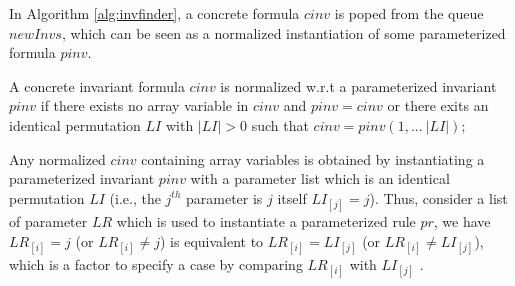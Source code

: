 \documentclass[final]{IEEEtran}
\newcommand\lyj[1]{\textcolor{magenta}{lyj: #1}}
\begin{document}
{In Algorithm \ref{alg:invfinder}, a concrete formula $cinv$ is poped from the queue $newInvs$, which can be seen as a normalized instantiation of some parameterized formula $pinv$. %


\begin{definition}
A  concrete invariant formula $cinv$ is normalized w.r.t a parameterized invariant $pinv$ if  there exists no array variable in $cinv$ and $pinv=cinv$ or there exits an identical permutation $LI$ with $|LI|>0$ such that $cinv=pinv(1,...~|LI|)$;

\end{definition}

Any normalized $cinv$ containing array variables is obtained by instantiating a parameterized invariant $pinv$ with a parameter list which is an identical permutation $LI$ (i.e., the $j^{th}$ parameter is $j$ itself $LI_{[j]}=j$). Thus, consider a list of parameter $LR$ which is used to instantiate a parameterized rule $pr$, we  have $LR_{[i]}=j$ (or $LR_{[i]}\ne j$) is equivalent to $LR_{[i]}=LI_{[j]}$ (or $LR_{[i]}\ne LI_{[j]}$), %
which is a factor to specify a case by comparing $LR_{[i]}$ with $LI_{[j]}$ .  %


}
\end{document}

